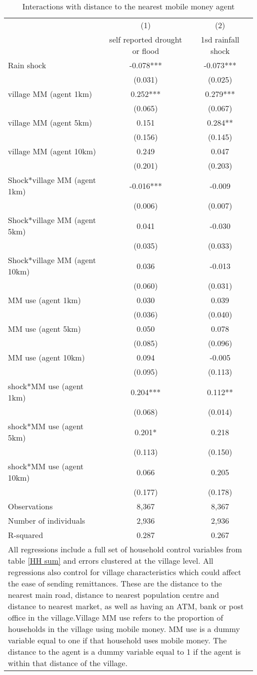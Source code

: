 \begin{table}
\centering \caption{Interactions with distance to the nearest mobile money agent} \label{distance}
\def\arraystretch{0.80}
\begin{tabular}{lcc} \hline
 & (1) & (2) \\
 & self reported drought or flood & 1sd rainfall shock \\ \hline
Rain shock & -0.078*** & -0.073*** \\
& (0.031) & (0.025) \\
village MM (agent 1km) & 0.252*** & 0.279*** \\
 & (0.065) & (0.067) \\
village MM (agent 5km) & 0.151 & 0.284**  \\
  & (0.156)  & (0.145) \\
village MM (agent 10km) & 0.249 & 0.047 \\
 & (0.201) & (0.203) \\
Shock*village MM (agent 1km)  & -0.016*** &  -0.009 \\
 & (0.006) &  (0.007)  \\
Shock*village MM (agent 5km) & 0.041 & -0.030 \\
 & (0.035) & (0.033)  \\
Shock*village MM (agent 10km)  & 0.036 & -0.013 \\
 & (0.060) &  (0.031) \\
MM use (agent 1km)  & 0.030 & 0.039 \\
 & (0.036) & (0.040) \\
MM use (agent 5km) & 0.050 &  0.078  \\
 & (0.085) &  (0.096)  \\
MM use (agent 10km)  & 0.094 & -0.005 \\
 & (0.095) & (0.113) \\
shock*MM use (agent 1km) & 0.204*** &  0.112**  \\
 & (0.068) &  (0.014) \\
shock*MM use (agent 5km) & 0.201* & 0.218 \\
 & (0.113) & (0.150) \\
shock*MM use (agent 10km) & 0.066 &  0.205   \\
 & (0.177) &  (0.178) \\
Observations & 8,367 & 8,367 \\
Number of individuals & 2,936 & 2,936 \\
R-squared & 0.287 & 0.267 \\
  \hline
\multicolumn{3}{p{14cm}}{All regressions include a full set of household control variables from table \ref{HH sum} and errors clustered at the village level.  All regressions also control for village characteristics which could affect the ease of sending remittances. These are the distance to the nearest main road, distance to nearest population centre and distance to nearest market, as well as having an ATM, bank or post office in the village.Village MM use refers to the proportion of households in the village using mobile money. MM use is a dummy variable equal to one if that household uses mobile money. The distance to the agent is a dummy variable equal to 1 if the agent is within that distance of the village.} \\

\end{tabular}
\end{table}

